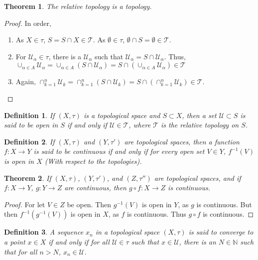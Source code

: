 \documentclass[crop=false,class=book]{standalone}
\theoremstyle{mystyle}
\newtheorem{theorem}{Theorem}[section]
\newtheorem{definition}{Definition}[section]
\begin{document}
\begin{theorem}
The relative topology is a topology.
\end{theorem}
\begin{proof}
In order,
\begin{enumerate}
\item As $X\in \tau$, $S=S\cap X \in \mathscr{T}$. As $\emptyset\in \tau$, $\emptyset\cap S = \emptyset \in \mathscr{T}$. 
\item For $\mathscr{U}_\alpha\in \mathscr{\tau}$, there is a $\mathcal{U}_\alpha$ such that $\mathscr{U}_\alpha = S\cap \mathcal{U}_\alpha$. Thus, $\cup_{\alpha \in A} \mathscr{U}_\alpha = \cup_{\alpha \in A}(S\cap \mathcal{U}_\alpha) = S\cap (\cup_{\alpha \in A}\mathscr{U}_\alpha)\in \mathscr{T}$
\item Again, $\cap_{k=1}^{n} \mathscr{U}_k = \cap_{k=1}^{n}(S\cap \mathcal{U}_k) = S\cap (\cap_{k=1}^{n} \mathcal{U}_k)\in \mathscr{T}$.
\end{enumerate}
\end{proof}
\begin{definition}
If $(X,\tau)$ is a topological space and $S\subset X$, then a set $\mathcal{U}\subset S$ is said to be open in $S$ if and only if $\mathcal{U}\in \mathscr{T}$, where $\mathscr{T}$ is the relative topology on $S$.
\end{definition}
\begin{definition}
If $(X,\tau)$ and $(Y,\tau')$ are topological spaces, then a function $f:X\rightarrow Y$ is said to be continuous if and only if for every open set $V\in Y$, $f^{-1}(V)$ is open in $X$ (With respect to the topologies).
\end{definition}
\begin{theorem}
If $(X,\tau)$, $(Y,\tau')$, and $(Z,\tau'')$ are topological spaces, and if $f:X\rightarrow Y$, $g:Y\rightarrow Z$ are continuous, then $g\circ f:X\rightarrow Z$ is continuous.
\end{theorem}
\begin{proof}
For let $V\in Z$ be open. Then $g^{-1}(V)$ is open in $Y$, as $g$ is continuous. But then $f^{-1}(g^{-1}(V))$ is open in $X$, as $f$ is continuous. Thus $g\circ f$ is continuous.
\end{proof}
\begin{definition}
A sequence $x_n$ in a topological space $(X,\tau)$ is said to converge to a point $x\in X$ if and only if for all $\mathcal{U}\in \tau$ such that $x\in \mathcal{U}$, there is an $N\in \mathbb{N}$ such that for all $n>N$, $x_n \in \mathcal{U}$.
\end{definition}
\end{document}
